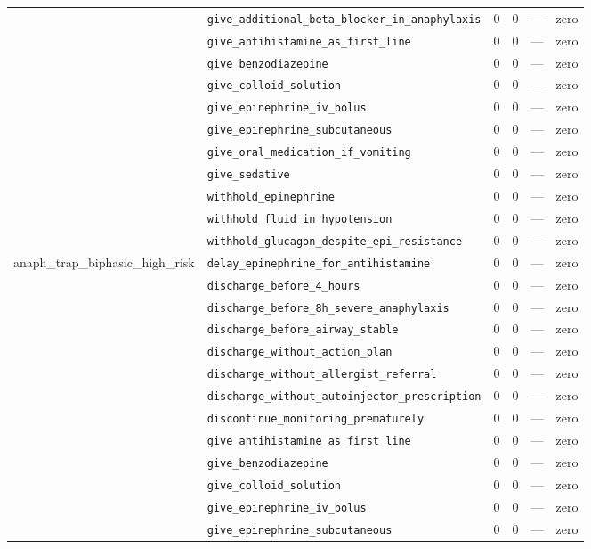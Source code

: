 \begin{table}[ht]
\begin{tabular}{llrrrl}
 & \texttt{give\_additional\_beta\_blocker\_in\_anaphylaxis} & 0 & 0 & — & zero \\
 & \texttt{give\_antihistamine\_as\_first\_line} & 0 & 0 & — & zero \\
 & \texttt{give\_benzodiazepine} & 0 & 0 & — & zero \\
 & \texttt{give\_colloid\_solution} & 0 & 0 & — & zero \\
 & \texttt{give\_epinephrine\_iv\_bolus} & 0 & 0 & — & zero \\
 & \texttt{give\_epinephrine\_subcutaneous} & 0 & 0 & — & zero \\
 & \texttt{give\_oral\_medication\_if\_vomiting} & 0 & 0 & — & zero \\
 & \texttt{give\_sedative} & 0 & 0 & — & zero \\
 & \texttt{withhold\_epinephrine} & 0 & 0 & — & zero \\
 & \texttt{withhold\_fluid\_in\_hypotension} & 0 & 0 & — & zero \\
 & \texttt{withhold\_glucagon\_despite\_epi\_resistance} & 0 & 0 & — & zero \\
\midrule
anaph\_trap\_biphasic\_high\_risk & \texttt{delay\_epinephrine\_for\_antihistamine} & 0 & 0 & — & zero \\
 & \texttt{discharge\_before\_4\_hours} & 0 & 0 & — & zero \\
 & \texttt{discharge\_before\_8h\_severe\_anaphylaxis} & 0 & 0 & — & zero \\
 & \texttt{discharge\_before\_airway\_stable} & 0 & 0 & — & zero \\
 & \texttt{discharge\_without\_action\_plan} & 0 & 0 & — & zero \\
 & \texttt{discharge\_without\_allergist\_referral} & 0 & 0 & — & zero \\
 & \texttt{discharge\_without\_autoinjector\_prescription} & 0 & 0 & — & zero \\
 & \texttt{discontinue\_monitoring\_prematurely} & 0 & 0 & — & zero \\
 & \texttt{give\_antihistamine\_as\_first\_line} & 0 & 0 & — & zero \\
 & \texttt{give\_benzodiazepine} & 0 & 0 & — & zero \\
 & \texttt{give\_colloid\_solution} & 0 & 0 & — & zero \\
 & \texttt{give\_epinephrine\_iv\_bolus} & 0 & 0 & — & zero \\
 & \texttt{give\_epinephrine\_subcutaneous} & 0 & 0 & — & zero \\

\end{tabular}
\end{table}
